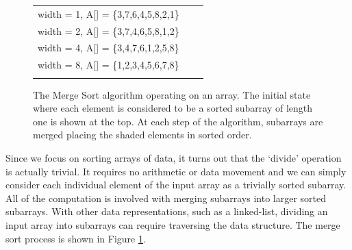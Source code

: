 \begin{figure}
\centering
\setlength{\fboxsep}{1pt}
\begin{tabular} {l l l } 
width = 1, A[] = \{\colorbox{black!10}{3},\colorbox{black!10}{7},\colorbox{black!10}{6},\colorbox{black!10}{4},\colorbox{black!10}{5},\colorbox{black!10}{8},\colorbox{black!10}{2},\colorbox{black!10}{1}\} \\
width = 2, A[] = \{\colorbox{black!10}{3,\hspace*{2\fboxsep}7},\colorbox{black!10}{4,\hspace*{2\fboxsep}6},\colorbox{black!10}{5,\hspace*{2\fboxsep}8},\colorbox{black!10}{1,\hspace*{2\fboxsep}2}\} \\
width = 4, A[] = \{\colorbox{black!10}{3,\hspace*{2\fboxsep}4,\hspace*{2\fboxsep}7,\hspace*{2\fboxsep}6},\colorbox{black!10}{1,\hspace*{2\fboxsep}2,\hspace*{2\fboxsep}5,\hspace*{2\fboxsep}8}\} \\
width = 8, A[] = \{\colorbox{black!10}{1,\hspace*{2\fboxsep}2,\hspace*{2\fboxsep}3,\hspace*{2\fboxsep}4,\hspace*{2\fboxsep}5,\hspace*{2\fboxsep}6,\hspace*{2\fboxsep}7,\hspace*{2\fboxsep}8}\} \\
\\
\end{tabular}
\caption{The Merge Sort algorithm operating on an array.  The initial state where each element is considered to be a sorted subarray of length one is shown at the top.   At each step of the algorithm, subarrays are merged placing the shaded elements in sorted order.}
\label{fig:merge_sort_behavior}
\end{figure}

Since we focus on sorting arrays of data, it turns out that the `divide' operation is actually trivial.  It requires no arithmetic or data movement and we can simply consider each individual element of the input array as a trivially sorted subarray.  All of the computation is involved with merging subarrays into larger sorted subarrays.  With other data representations, such as a linked-list, dividing an input array into subarrays can require traversing the data structure.   The merge sort process is shown in Figure \ref{fig:merge_sort_behavior}.  

